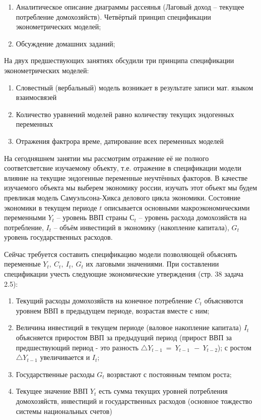 \documentclass[12pt,a4paper]{article}
\author{Аверьянов Т.С.}
\begin{document}
\begin{enumerate}
\item Аналитическое описание диаграммы рассеянья (Лаговый доход -- текущее потребление домохозяйств). Четвёртый принцип спецификации эконометрических моделей;
\item Обсуждение домашних заданий;
\end{enumerate}

На двух предшествующих занятиях обсудили три принципа спецификации эконометрических моделей:
\begin{enumerate}
\item Словестный (вербальный) модель возникает в результате записи мат. языком взаимосвязей
\item Количество уравнений моделей равно количеству текущих эндогенных переменных
\item Отражения фактрора време, датирование всех переменных моделей
\end{enumerate}

На сегодняшнем занятии мы рассмотрим отражение её не полного соответсветсвие изучаемому объекту, т.е. отражение в спецификации модели влияние на текущие эндогенные переменные неучтённых факторов. В качестве изучаемого объекта мы выберем экономику россии, изучать этот объект мы будем превликая модель Самуэльсона-Хикса делового цикла экономики. Состояние экономики в текущем периоде $t$ описывается основными макроэкономическими переменными $Y_t$ -- уровень ВВП страны $С_t$ -- уровень расхода домохозяйств на потребление, $I_t$ -- объём инвестиций в экономику (накопление капитала), $G_t$ уровень государственных расходов.

Сейчас требуется составить спецификацию модели позволяющей объяснять переменные $\displaystyle Y_{t} ,\ C_{t} ,\ I_{t} ,\ G_{t}$ их лаговыми значениями. При составлении спецификации учесть следующие экономические утверждения (стр. 38 задача 2.5):
\begin{enumerate}
\item Текущий расходы домохозяйств на конечное потребление $\displaystyle C_{t}$ объясняются уровнем ВВП в предыдущем периоде, возрастая вместе с ним;
\item Величина инвестиций в текущем периоде (валовое накопление капитала) $\displaystyle I_{t}$объясняется приростом ВВП за предыдущий период (прирост ВВП за предшествующий период - это разность $\displaystyle \triangle Y_{t-1} \ =\ Y_{t-1\ } \ -\ Y_{t-2}$); с ростом $\displaystyle \triangle Y_{t-1}$ увеличивается и $\displaystyle I_{t}$;
\item Государственные расходы $\displaystyle G_{t}$ возрвстают с постоянным темпом роста;
\item Текущее значение ВВП $\displaystyle Y_{t}$ есть сумма текущих уровней потребления домохозяйств, инвестиций и государственных расходов (основное тождество системы национальных счетов)
\end{enumerate}
\end{document}
